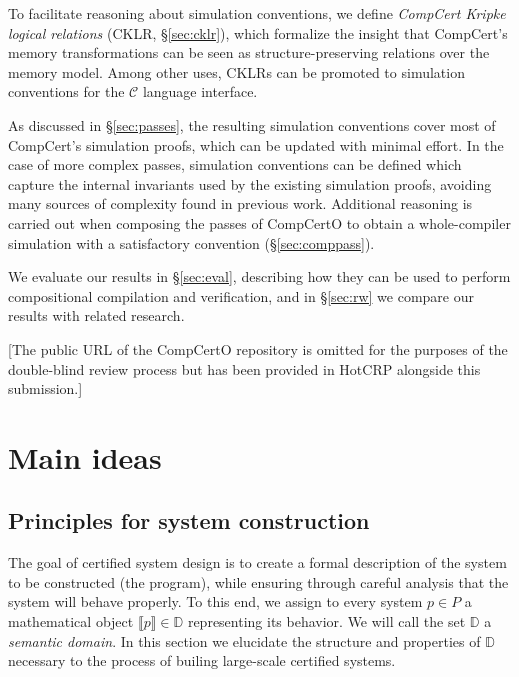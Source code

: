 \documentclass[acmsmall,authordraft]{acmart}
\begin{document}
To facilitate reasoning about
simulation conventions,
we define \emph{CompCert Kripke logical relations}
(CKLR, \S\ref{sec:cklr}),
which formalize the insight that
CompCert's memory transformations can be seen
as structure-preserving relations
over the memory model.
Among other uses,
CKLRs can be promoted to
simulation conventions for the $\mathcal{C}$
language interface.

As discussed in \S\ref{sec:passes},
the resulting simulation conventions
cover most of CompCert's simulation proofs,
which can be updated with minimal effort.
In the case of more complex passes,
simulation conventions can be defined
which capture the internal invariants
used by the existing simulation proofs,
avoiding many sources of complexity found
in previous work.
Additional reasoning is carried out
when composing the passes of CompCertO
to obtain a whole-compiler simulation
with a satisfactory convention (\S\ref{sec:comppass}).

We evaluate our results in \S\ref{sec:eval},
describing how they
can be used to perform compositional compilation and verification,
and in \S\ref{sec:rw} we compare our results with related research.

[The public URL of the CompCertO repository is omitted
for the purposes of the double-blind review process
but has been provided in HotCRP alongside this submission.]



\section{Main ideas} \label{sec:mainideas} %

\subsection{Principles for system construction} \label{sec:principles} %


The goal of certified system design is
to create a formal description of
the system to be constructed (the program),
while ensuring
through careful analysis
that the system
will behave properly.
To this end,
we assign
to every system $p \in P$
a mathematical object $\llbracket p \rrbracket \in \mathbb{D}$
representing its behavior.
We will call the set $\mathbb{D}$ a \emph{semantic domain}.
In this section we elucidate
the structure and properties of $\mathbb{D}$
necessary to the process of builing
large-scale certified systems.
\end{document}
